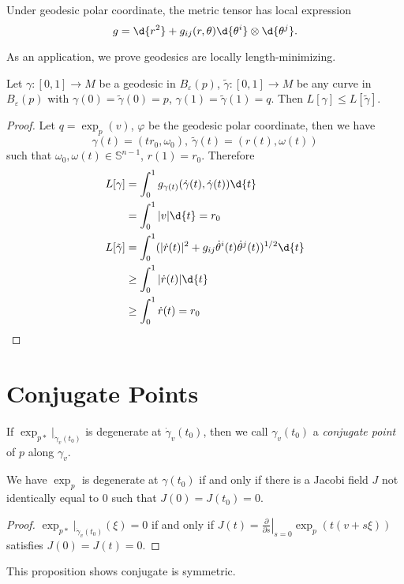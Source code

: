 \begin{cor}
    Under geodesic polar coordinate, the metric tensor has local expression
    \[g=\d{r^2}+g_{ij}(r,\theta)\d{\theta^i}\otimes\d{\theta^j}.\]
\end{cor}

As an application, we prove geodesics are locally length-minimizing.
\begin{prop}\label{locally length-min}
    Let $\gamma:[0,1]\to M$ be a geodesic in $B_\varepsilon(p)$, $\tilde{\gamma}:[0,1]\to M$ be any curve in $B_\varepsilon(p)$ with $\gamma(0)=\tilde{\gamma}(0)=p$, $\gamma(1)=\tilde{\gamma}(1)=q$.
    Then $L[\gamma]\leq L[\tilde{\gamma}]$.
\end{prop}
\begin{proof}
    Let $q=\exp_p(v)$, $\varphi$ be the geodesic polar coordinate, then we have
    \[\gamma(t)=(tr_0,\omega_0),\ \tilde{\gamma}(t)=(r(t),\omega(t))\]
    such that $\omega_0,\omega(t)\in\mathbb{S}^{n-1}$, $r(1)=r_0$.
    Therefore
    \begin{align*}
        L[\gamma]&=\int_0^1g_{\gamma(t)}(\dot{\gamma}(t),\dot{\gamma}(t))\d{t}\\
        &=\int_0^1|v|\d{t}=r_0\\
        L[\tilde{\gamma}]&=\int_0^1(|\dot{r}(t)|^2+g_{ij}\dot{\theta}^i(t)\dot{\theta}^j(t))^{1/2}\d{t}\\
        &\geq\int_0^1|\dot{r}(t)|\d{t}\\
        &\geq\int_0^1\dot{r}(t)=r_0\qedhere
    \end{align*}
\end{proof}

\section{Conjugate Points}

\begin{defn}
    If $\exp_{p*}|_{\dot{\gamma}_v(t_0)}$ is degenerate at $\dot{\gamma}_v(t_0)$, then we call $\gamma_v(t_0)$ a \emph{conjugate point} of $p$ along $\gamma_v$.
\end{defn}

\begin{prop}
    We have $\exp_p$ is degenerate at $\gamma(t_0)$ if and only if there is a Jacobi field $J$ not identically equal to $0$ such that $J(0)=J(t_0)=0$.
\end{prop}
\begin{proof}
    $\exp_{p*}|_{\dot{\gamma}_v(t_0)}(\xi)=0$ if and only if $J(t)=\left.\frac{\partial{}}{\partial{s}}\right|_{s=0}\exp_p(t(v+s\xi))$ satisfies $J(0)=J(t)=0$.
\end{proof}

\begin{rem}
    This proposition shows conjugate is symmetric.
\end{rem}